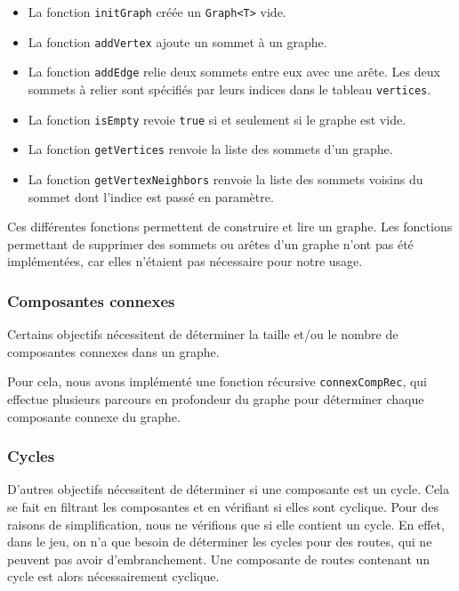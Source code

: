 \begin{itemize}
    \item La fonction \texttt{initGraph} créée un \texttt{Graph<T>} vide.
    \item La fonction \texttt{addVertex} ajoute un sommet à un graphe.
    \item La fonction \texttt{addEdge} relie deux sommets entre eux avec une arête. Les deux sommets à relier sont spécifiés par leurs indices dans le tableau \texttt{vertices}.
    \\
    \item La fonction \texttt{isEmpty} revoie \texttt{true} si et seulement si le graphe est vide.
    \item La fonction \texttt{getVertices} renvoie la liste des sommets d'un graphe.
    \item La fonction \texttt{getVertexNeighbors} renvoie la liste des sommets voisins du sommet dont l'indice est passé en paramètre.
\end{itemize}

Ces différentes fonctions permettent de construire et lire un graphe. Les fonctions permettant de supprimer des sommets ou arêtes d'un graphe n'ont pas été implémentées, car elles n'étaient pas nécessaire pour notre usage.

\subsubsection{Composantes connexes}

Certains objectifs nécessitent de déterminer la taille et/ou le nombre de composantes connexes dans un graphe.

Pour cela, nous avons implémenté une fonction récursive \texttt{connexCompRec}, qui effectue plusieurs parcours en profondeur du graphe pour déterminer chaque composante connexe du graphe.

\subsubsection{Cycles}

D'autres objectifs nécessitent de déterminer si une composante est un cycle. Cela se fait en filtrant les composantes et en vérifiant si elles sont cyclique. Pour des raisons de simplification, nous ne vérifions que si elle contient un cycle. En effet, dans le jeu, on n'a que besoin de déterminer les cycles pour des routes, qui ne peuvent pas avoir d'embranchement. Une composante de routes contenant un cycle est alors nécessairement cyclique.

